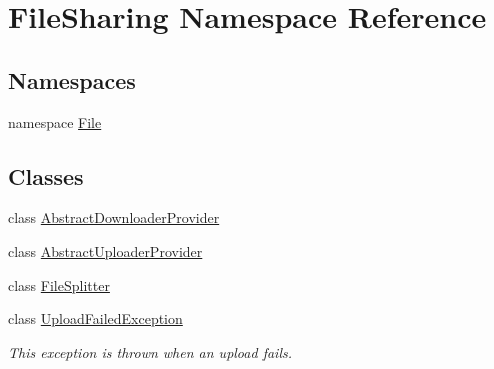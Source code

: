 \hypertarget{namespace_file_sharing}{}\section{File\+Sharing Namespace Reference}
\label{namespace_file_sharing}
\subsection*{Namespaces}
\begin{DoxyCompactItemize}
\item 
namespace \hyperlink{namespace_file_sharing_1_1_file}{File}
\end{DoxyCompactItemize}
\subsection*{Classes}
\begin{DoxyCompactItemize}
\item 
class \hyperlink{class_file_sharing_1_1_abstract_downloader_provider}{Abstract\+Downloader\+Provider}
\item 
class \hyperlink{class_file_sharing_1_1_abstract_uploader_provider}{Abstract\+Uploader\+Provider}
\item 
class \hyperlink{class_file_sharing_1_1_file_splitter}{File\+Splitter}
\item 
class \hyperlink{class_file_sharing_1_1_upload_failed_exception}{Upload\+Failed\+Exception}
\begin{DoxyCompactList}\small\item\em This exception is thrown when an upload fails. \end{DoxyCompactList}\end{DoxyCompactItemize}
